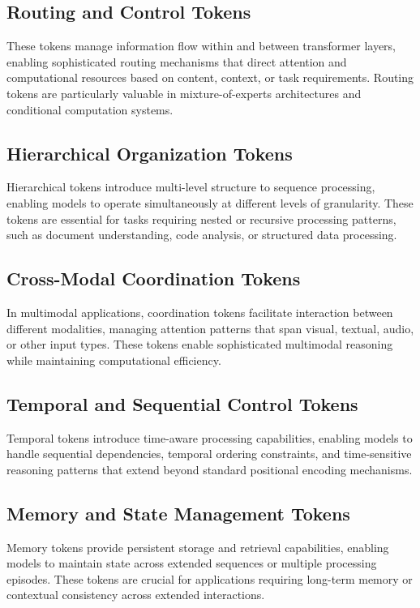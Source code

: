 \subsection{Routing and Control Tokens}

These tokens manage information flow within and between transformer layers, enabling sophisticated routing mechanisms that direct attention and computational resources based on content, context, or task requirements. Routing tokens are particularly valuable in mixture-of-experts architectures and conditional computation systems.

\subsection{Hierarchical Organization Tokens}

Hierarchical tokens introduce multi-level structure to sequence processing, enabling models to operate simultaneously at different levels of granularity. These tokens are essential for tasks requiring nested or recursive processing patterns, such as document understanding, code analysis, or structured data processing.

\subsection{Cross-Modal Coordination Tokens}

In multimodal applications, coordination tokens facilitate interaction between different modalities, managing attention patterns that span visual, textual, audio, or other input types. These tokens enable sophisticated multimodal reasoning while maintaining computational efficiency.

\subsection{Temporal and Sequential Control Tokens}

Temporal tokens introduce time-aware processing capabilities, enabling models to handle sequential dependencies, temporal ordering constraints, and time-sensitive reasoning patterns that extend beyond standard positional encoding mechanisms.

\subsection{Memory and State Management Tokens}

Memory tokens provide persistent storage and retrieval capabilities, enabling models to maintain state across extended sequences or multiple processing episodes. These tokens are crucial for applications requiring long-term memory or contextual consistency across extended interactions.


